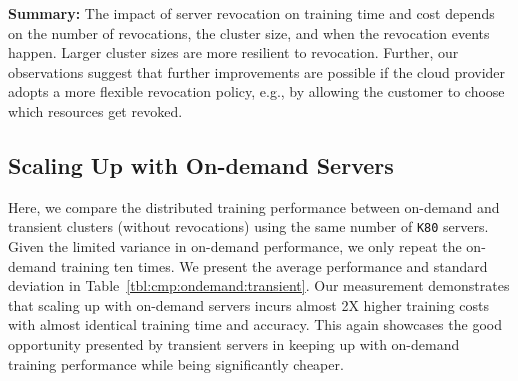 \textbf{Summary:} The impact of server revocation on training time and
cost depends on the  number of revocations, the cluster size, and when
the revocation events happen. Larger cluster sizes are more resilient to
revocation. Further, our observations suggest that further improvements are
possible if the cloud provider adopts a more flexible revocation policy, e.g.,
by allowing the customer to choose which resources
get revoked.
 






\subsection{Scaling Up with On-demand Servers}


Here, we compare the distributed training performance
between on-demand and transient clusters (without revocations) using the same number of \texttt{K80} servers. 
Given the limited variance in on-demand
performance, we only repeat the  on-demand training ten times. We present the
average performance and standard deviation in
Table~\ref{tbl:cmp:ondemand:transient}.  Our measurement demonstrates that
scaling up with on-demand servers incurs almost 2X higher training costs with
almost identical training time and accuracy.  This again showcases the good
opportunity presented by transient servers in keeping up with on-demand
training performance while being significantly cheaper. 

